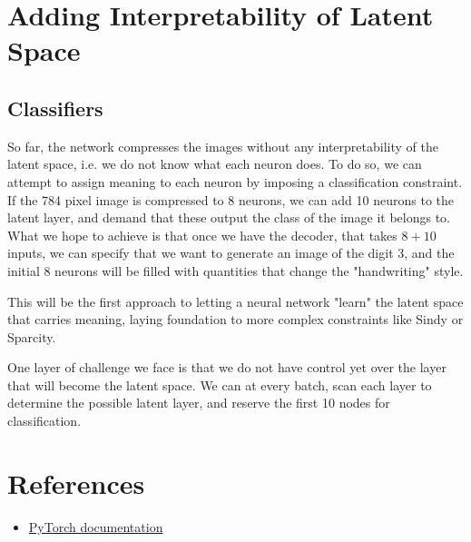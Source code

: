 \documentclass[12pt]{article}
\begin{document}
\section{Adding Interpretability of Latent Space}
\subsection{Classifiers}
So far, the network compresses the images without any interpretability of the latent space, i.e. we do not know what each neuron does. To do so, we can attempt to assign meaning to each neuron by imposing a classification constraint. If the 784 pixel image is compressed to 8 neurons, we can add 10 neurons to the latent layer, and demand that these output the class of the image it belongs to. What we hope to achieve is that once we have the decoder, that takes \(8 + 10\) inputs, we can specify that we want to generate an image of the digit 3, and the initial 8 neurons will be filled with quantities that change the "handwriting" style.

This will be the first approach to letting a neural network "learn" the latent space that carries meaning, laying foundation to more complex constraints like Sindy or Sparcity. 

One layer of challenge we face is that we do not have control yet over the layer that will become the latent space. We can at every batch, scan each layer to determine the possible latent layer, and reserve the first 10 nodes for classification. 


\section{References}
\begin{itemize}
    \item \href{https://pytorch.org}{PyTorch documentation}
\end{itemize}
\end{document}
